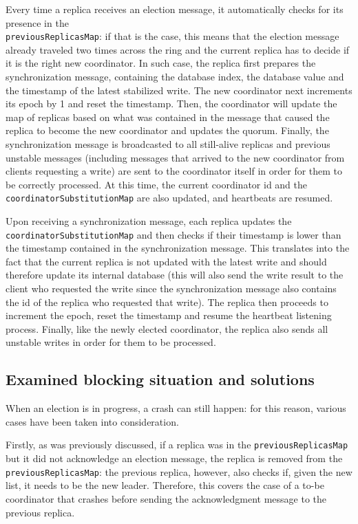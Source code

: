 Every time a replica receives an election message, it automatically checks for its presence in the \\ \texttt{previousReplicasMap}: if that is the case, this means that the election message already traveled two times across the ring and the current replica has to decide if it is the right new coordinator. In such case, the replica first prepares the synchronization message, containing the database index, the database value and the timestamp of the latest stabilized write. The new coordinator next increments its epoch by 1 and reset the timestamp. Then, the coordinator will update the map of replicas based on what was contained in the message that caused the replica to become the new coordinator and updates the quorum. Finally, the synchronization message is broadcasted to all still-alive replicas and previous unstable messages (including messages that arrived to the new coordinator from clients requesting a write) are sent to the coordinator itself in order for them to be correctly processed. At this time, the current coordinator id and the \texttt{coordinatorSubstitutionMap} are also updated, and heartbeats are resumed.

Upon receiving a synchronization message, each replica updates the \texttt{coordinatorSubstitutionMap} and then checks if their timestamp is lower than the timestamp contained in the synchronization message. This translates into the fact that the current replica is not updated with the latest write and should therefore update its internal database (this will also send the write result to the client who requested the write since the synchronization message also contains the id of the replica who requested that write). The replica then proceeds to increment the epoch, reset the timestamp and resume the heartbeat listening process. Finally, like the newly elected coordinator, the replica also sends all unstable writes in order for them to be processed.

\subsection{Examined blocking situation and solutions}

When an election is in progress, a crash can still happen: for this reason, various cases have been taken into consideration.

Firstly, as was previously discussed, if a replica was in the \texttt{previousReplicasMap} but it did not acknowledge an election message, the replica is removed from the \texttt{previousReplicasMap}: the previous replica, however, also checks if, given the new list, it needs to be the new leader. Therefore, this covers the case of a to-be coordinator that crashes before sending the acknowledgment message to the previous replica.

